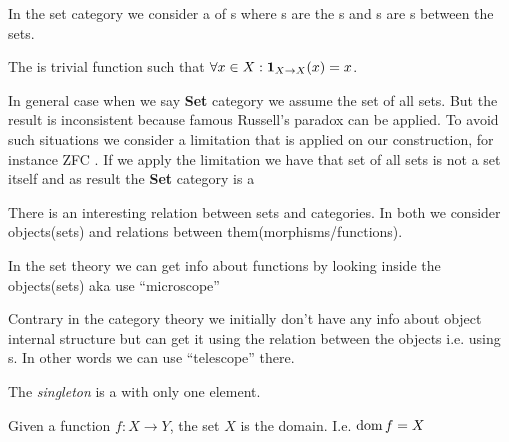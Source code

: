 \begin{definition}
  \label{def:setcategory}
  In the set category we consider a  of
  s where 
  s are the s and
  s are s between the
  sets.

  The  is trivial function such that $\forall x \in
  X: \mathbf{1}_{ X \to X }(x) = x$.

  In general case when we say \textbf{Set} category we assume the set
  of all sets. But the result is inconsistent because famous Russell's
  paradox \cite{wiki:russell_paradox} can be applied. To avoid such
  situations we consider a limitation that is applied on our
  construction, for instance 
  ZFC \cite{wiki:zfc}. If we apply the limitation we have that set of
  all sets is not a set itself and as result the  \textbf{Set}
  category is a 
\end{definition}

\begin{remark}
  \label{rem:set_vs_category}
  There is an interesting relation between sets and categories. In both
  we consider objects(sets) and relations between
  them(morphisms/functions). 

  In the set theory we can get info about functions by looking inside
  the objects(sets) aka use ``microscope'' \cite{bib:milewski2018category} 

  Contrary in the category theory we initially don't have any info about object
  internal structure but can get it using the relation between the
  objects i.e. using s. In other words we can use
  ``telescope'' \cite{bib:milewski2018category}  there.
\end{remark}

\begin{definition}[Singleton]
\label{def:singleton_set} 
The \textit{singleton} is a  with only one element.
\end{definition}

\begin{example}[Domain]
  \label{ex:domain_set}
  Given a function $f: X \to Y$, the set $X$ is the domain. I.e. $\operatorname{dom}
  f = X$
\end{example}

